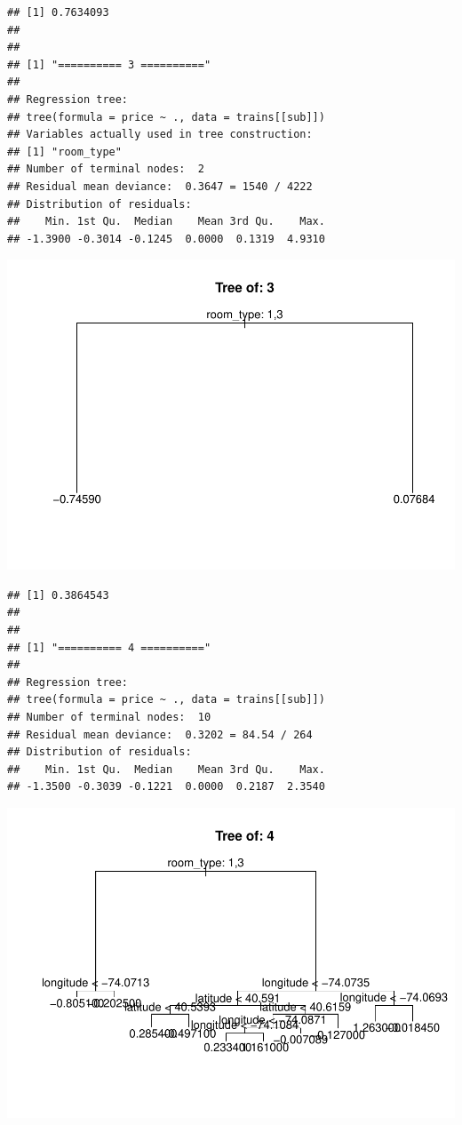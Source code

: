 \documentclass[
]{article}
\begin{document}
\begin{verbatim}
## [1] 0.7634093
## 
## 
## [1] "========== 3 =========="
## 
## Regression tree:
## tree(formula = price ~ ., data = trains[[sub]])
## Variables actually used in tree construction:
## [1] "room_type"
## Number of terminal nodes:  2 
## Residual mean deviance:  0.3647 = 1540 / 4222 
## Distribution of residuals:
##    Min. 1st Qu.  Median    Mean 3rd Qu.    Max. 
## -1.3900 -0.3014 -0.1245  0.0000  0.1319  4.9310
\end{verbatim}

\includegraphics{project-code_files/figure-latex/unnamed-chunk-14-3.pdf}

\begin{verbatim}
## [1] 0.3864543
## 
## 
## [1] "========== 4 =========="
## 
## Regression tree:
## tree(formula = price ~ ., data = trains[[sub]])
## Number of terminal nodes:  10 
## Residual mean deviance:  0.3202 = 84.54 / 264 
## Distribution of residuals:
##    Min. 1st Qu.  Median    Mean 3rd Qu.    Max. 
## -1.3500 -0.3039 -0.1221  0.0000  0.2187  2.3540
\end{verbatim}

\includegraphics{project-code_files/figure-latex/unnamed-chunk-14-4.pdf}
\end{document}
